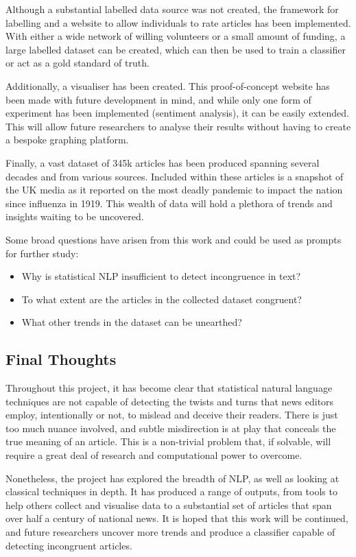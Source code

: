 Although a substantial labelled data source was not created, the framework for labelling and a website to allow individuals to rate articles has been implemented. With either a wide network of willing volunteers or a small amount of funding, a large labelled dataset can be created, which can then be used to train a classifier or act as a gold standard of truth.

Additionally, a visualiser has been created. This proof-of-concept website has been made with future development in mind, and while only one form of experiment has been implemented (sentiment analysis), it can be easily extended. This will allow future researchers to analyse their results without having to create a bespoke graphing platform. 

Finally, a vast dataset of 345k articles has been produced spanning several decades and from various sources. Included within these articles is a snapshot of the UK media as it reported on the most deadly pandemic to impact the nation since influenza in 1919. This wealth of data will hold a plethora of trends and insights waiting to be uncovered.

Some broad questions have arisen from this work and could be used as prompts for further study:
\begin{itemize}
	\item Why is statistical NLP insufficient to detect incongruence in text?
	\item To what extent are the articles in the collected dataset congruent?
	\item What other trends in the dataset can be unearthed?	
\end{itemize} 

\subsection{Final Thoughts}

Throughout this project, it has become clear that statistical natural language techniques are not capable of detecting the twists and turns that news editors employ, intentionally or not, to mislead and deceive their readers. There is just too much nuance involved, and subtle misdirection is at play that conceals the true meaning of an article. This is a non-trivial problem that, if solvable, will require a great deal of research and computational power to overcome.

Nonetheless, the project has explored the breadth of NLP, as well as looking at classical techniques in depth. It has produced a range of outputs, from tools to help others collect and visualise data to a substantial set of articles that span over half a century of national news. It is hoped that this work will be continued, and future researchers uncover more trends and produce a classifier capable of detecting incongruent articles.

